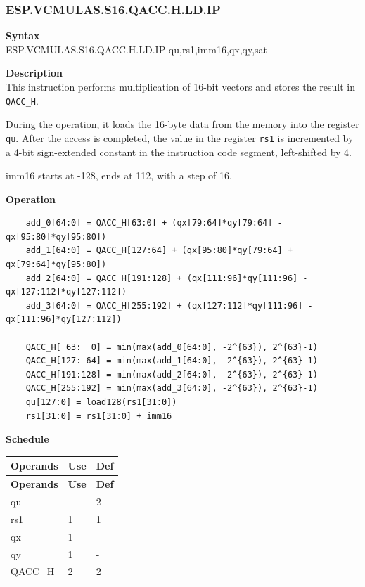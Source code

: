 \newpage
\subsubsection{ESP.VCMULAS.S16.QACC.H.LD.IP}\label{instruction:ESPVCMULASS16QACC_HLDIP}
\textbf{Syntax}\\
ESP.VCMULAS.S16.QACC.H.LD.IP qu,rs1,imm16,qx,qy,sat

\textbf{Description}\\
This instruction performs multiplication of 16-bit vectors and stores the result in \lstinline{QACC_H}.

During the operation, it loads the 16-byte data from the memory into the register \lstinline{qu}. After the access is completed, the value in the register \lstinline{rs1} is incremented by a 4-bit sign-extended constant in the instruction code segment, left-shifted by 4.

imm16 starts at -128, ends at 112, with a step of 16.

\textbf{Operation}\\
\begin{lstlisting}
    add_0[64:0] = QACC_H[63:0] + (qx[79:64]*qy[79:64] - qx[95:80]*qy[95:80])
    add_1[64:0] = QACC_H[127:64] + (qx[95:80]*qy[79:64] + qx[79:64]*qy[95:80])
    add_2[64:0] = QACC_H[191:128] + (qx[111:96]*qy[111:96] - qx[127:112]*qy[127:112])
    add_3[64:0] = QACC_H[255:192] + (qx[127:112]*qy[111:96] - qx[111:96]*qy[127:112])

    QACC_H[ 63:  0] = min(max(add_0[64:0], -2^{63}), 2^{63}-1)
    QACC_H[127: 64] = min(max(add_1[64:0], -2^{63}), 2^{63}-1)
    QACC_H[191:128] = min(max(add_2[64:0], -2^{63}), 2^{63}-1)
    QACC_H[255:192] = min(max(add_3[64:0], -2^{63}), 2^{63}-1)
    qu[127:0] = load128(rs1[31:0])
    rs1[31:0] = rs1[31:0] + imm16
\end{lstlisting}

\textbf{Schedule}\\
\begin{longtable}[c]{|l|l|l|}
    \hline
    \rowcolor{lightgray}
    \textbf{Operands} & \textbf{Use} & \textbf{Def} \\\hline
    \endfirsthead
    \hline
    \rowcolor{lightgray}
     \textbf{Operands} & \textbf{Use} & \textbf{Def} \\\hline
    \endhead
    \hline
    \endfoot

    qu & - & 2 \\\hline
    rs1 & 1 & 1 \\\hline
     qx & 1 & - \\\hline
     qy & 1 & - \\\hline
     QACC\_H & 2 & 2

\end{longtable}

